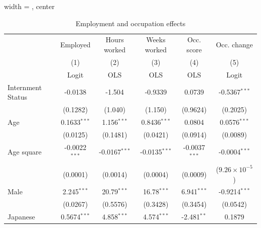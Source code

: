 \documentclass{beamer}
\begin{document}
\begin{frame}
  \begin{table}[htbp]
     \caption{\label{tbl:reg2} Employment and occupation effects}
     \begin{adjustbox}{width = \textwidth, center}
        \begin{tabular}{lccccc}
           \toprule
                                 & Employed        & Hours worked    & Weeks worked    & Occ. score      & Occ. change\\  
                                 & (1)             & (2)             & (3)             & (4)             & (5)\\  
                                 &  Logit          & OLS             & OLS             & OLS             & Logit\\  
           \midrule 
           \rowcolor{blue!30}Internment Status     & -0.0138         & -1.504          & -0.9339         & 0.0739          & -0.5367$^{***}$\\   
           \rowcolor{blue!30}    & (0.1282)        & (1.040)         & (1.150)         & (0.9624)        & (0.2025)\\   
           Age                   & 0.1633$^{***}$  & 1.156$^{***}$   & 0.8436$^{***}$  & 0.0804          & 0.0576$^{***}$\\   
                                 & (0.0125)        & (0.1481)        & (0.0421)        & (0.0914)        & (0.0089)\\   
           Age square            & -0.0022$^{***}$ & -0.0167$^{***}$ & -0.0135$^{***}$ & -0.0037$^{***}$ & -0.0004$^{***}$\\   
                                 & (0.0001)        & (0.0014)        & (0.0004)        & (0.0009)        & ($9.26\times 10^{-5}$)\\    
           Male                  & 2.245$^{***}$   & 20.79$^{***}$   & 16.78$^{***}$   & 6.941$^{***}$   & -0.9214$^{***}$\\   
                                 & (0.0267)        & (0.5576)        & (0.3428)        & (0.3454)        & (0.0542)\\   
           Japanese              & 0.5674$^{***}$  & 4.858$^{***}$   & 4.574$^{***}$   & -2.481$^{**}$   & 0.1879\\   

\end{tabular}
\end{adjustbox}
\end{table}
\end{frame}
\end{document}

